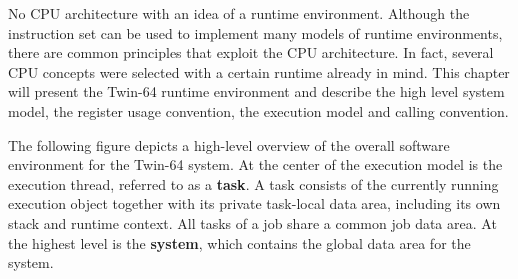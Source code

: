 %
%

No CPU architecture with an idea of a runtime environment. Although the instruction set can be used to implement many models of runtime environments, there are common principles that exploit the CPU architecture. In fact, several CPU concepts were selected with a certain runtime already in mind. This chapter will present the Twin-64 runtime environment and describe the high level system model, the register usage convention, the execution model and calling convention.


The following figure depicts a high-level overview of the overall software environment for the Twin-64 system. At the center of the execution model is the execution thread, referred to as a \textbf{task}. A task consists of the currently running execution object together with its private task-local data area, including its own stack and runtime context. All tasks of a job share a common job data area. At the highest level is the \textbf{system}, which contains the global data area for the system. 


